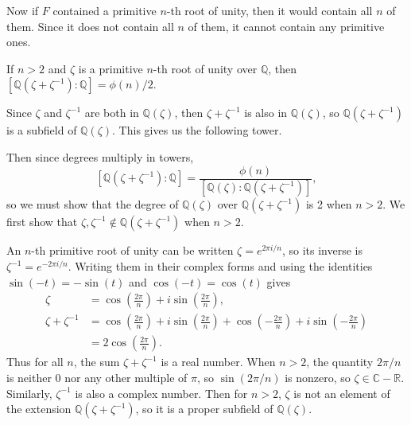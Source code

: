 \documentclass[10pt]{report}
\begin{document}
Now if $F$ contained a primitive $n$-th root of unity, then it would contain all $n$ of them. Since it does not contain all $n$ of them, it cannot contain any primitive ones.

\newpage

\begin{exer}[]
	If $n>2$ and $\zeta$ is a primitive $n$-th root of unity over $\mathbb{Q}$, then $[\mathbb{Q}(\zeta+\zeta^{-1}):\mathbb{Q}]=\phi(n)/2$.
\end{exer}
Since $\zeta$ and $\zeta^{-1}$ are both in $\mathbb{Q}(\zeta)$, then $\zeta+\zeta^{-1}$ is also in $\mathbb{Q}(\zeta)$, so $\mathbb{Q}(\zeta+\zeta^{-1})$ is a subfield of $\mathbb{Q}(\zeta)$. This gives us the following tower.
\begin{figure}[H]
	\centering
\end{figure}
Then since degrees multiply in towers,
\[
[\mathbb{Q}(\zeta+\zeta^{-1}):\mathbb{Q}] = \frac{\phi(n)}{[\mathbb{Q}(\zeta):\mathbb{Q}(\zeta+\zeta^{-1})]},
\] so we must show that the degree of $\mathbb{Q}(\zeta)$ over $\mathbb{Q}(\zeta+\zeta^{-1})$ is 2 when $n>2$. We first show that $\zeta,\zeta^{-1} \not\in \mathbb{Q}(\zeta+\zeta^{-1})$ when $n>2$.

	An $n$-th primitive root of unity can be written $\zeta = e^{2\pi i/n}$, so its inverse is $\zeta^{-1} = e^{-2\pi i/n}$. Writing them in their complex forms and using the identities $\sin(-t)=-\sin(t)$ and $\cos(-t)=\cos(t)$ gives
	\begin{align*}
		\zeta &= \cos\left( \frac{2\pi}{n}  \right)+i \sin\left( \frac{2\pi}{n}  \right), \\
		\zeta+\zeta^{-1} &= \cos\left( \frac{2\pi}{n}  \right)+i \sin\left( \frac{2\pi}{n}  \right) + \cos\left(- \frac{2\pi}{n}  \right)+i \sin\left(- \frac{2\pi}{n}  \right) \\
				 &= 2 \cos\left( \frac{2\pi}{n}  \right).
	\end{align*}
	Thus for all $n$, the sum $\zeta+\zeta^{-1}$ is a real number. When $n>2$, the quantity $2\pi/n$ is neither 0 nor any other multiple of $\pi$, so $\sin(2\pi/n)$ is nonzero, so $\zeta \in \mathbb{C}-\mathbb{R}$. Similarly, $\zeta^{-1}$ is also a complex number. Then for $n>2$, $\zeta$ is not an element of the extension $\mathbb{Q}(\zeta+\zeta^{-1})$, so it is a proper subfield of $\mathbb{Q}(\zeta)$.
\end{document}
